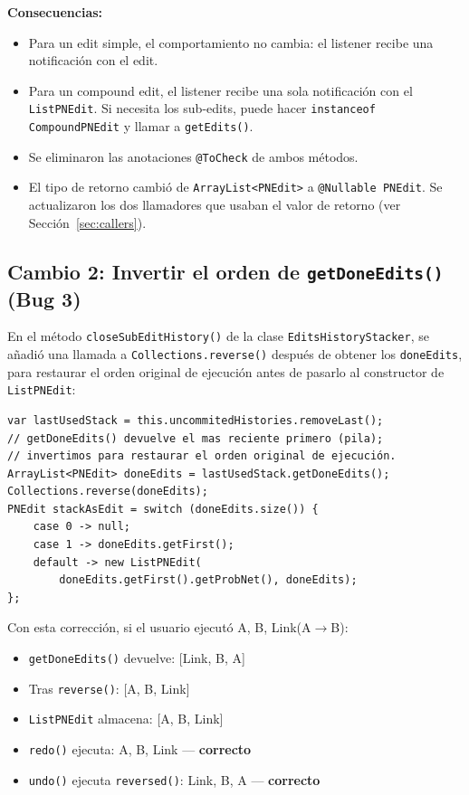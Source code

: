 \documentclass[12pt,a4paper]{article}
\newcommand{\code}[1]{\texttt{#1}}
\newcommand{\clase}[1]{\texttt{#1}}
\newcommand{\metodo}[1]{\texttt{#1}}
\begin{document}
\textbf{Consecuencias:}
\begin{itemize}
  \item Para un edit simple, el comportamiento no cambia: el listener recibe
        una notificación con el edit.
  \item Para un compound edit, el listener recibe una sola notificación con
        el \clase{ListPNEdit}. Si necesita los sub-edits, puede hacer
        \code{instanceof CompoundPNEdit} y llamar a \metodo{getEdits()}.
  \item Se eliminaron las anotaciones \code{@ToCheck} de ambos métodos.
  \item El tipo de retorno cambió de \code{ArrayList<PNEdit>} a
        \code{@Nullable PNEdit}. Se actualizaron los dos llamadores que
        usaban el valor de retorno (ver Sección~\ref{sec:callers}).
\end{itemize}


\subsection{Cambio 2: Invertir el orden de \metodo{getDoneEdits()} (Bug 3)}

En el método \metodo{closeSubEditHistory()} de la clase
\clase{EditsHistoryStacker}, se añadió una llamada a
\metodo{Collections.reverse()} después de obtener los \code{doneEdits},
para restaurar el orden original de ejecución antes de pasarlo al
constructor de \clase{ListPNEdit}:

\begin{lstlisting}[caption={\metodo{closeSubEditHistory()} corregido (fragmento).},
  label=lst:close-despues, backgroundcolor=\color{fixbg}]
var lastUsedStack = this.uncommitedHistories.removeLast();
// getDoneEdits() devuelve el mas reciente primero (pila);
// invertimos para restaurar el orden original de ejecución.
ArrayList<PNEdit> doneEdits = lastUsedStack.getDoneEdits();
Collections.reverse(doneEdits);
PNEdit stackAsEdit = switch (doneEdits.size()) {
    case 0 -> null;
    case 1 -> doneEdits.getFirst();
    default -> new ListPNEdit(
        doneEdits.getFirst().getProbNet(), doneEdits);
};
\end{lstlisting}

Con esta corrección, si el usuario ejecutó A, B, Link(A$\to$B):
\begin{itemize}
  \item \code{getDoneEdits()} devuelve: [Link, B, A]
  \item Tras \code{reverse()}: [A, B, Link]
  \item \clase{ListPNEdit} almacena: [A, B, Link]
  \item \metodo{redo()} ejecuta: A, B, Link --- \textbf{correcto}
  \item \metodo{undo()} ejecuta \code{reversed()}: Link, B, A --- \textbf{correcto}
\end{itemize}
\end{document}

